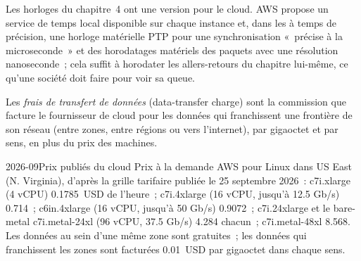Les horloges du chapitre~4 ont une version pour le cloud. AWS propose un service de temps local disponible sur chaque instance et, dans les  à temps de précision,
une horloge matérielle PTP pour une synchronisation «~précise à la microseconde~» et des horodatages matériels des paquets avec une résolution nanoseconde~; cela suffit à
horodater les allers-retours du chapitre lui-même, ce qu'une société doit faire pour voir sa queue.

\begin{definition}\label{def:nw:trading-in-a-public-cloud:dtc}
Les \emph{frais de transfert de données} (data-transfer charge) sont la commission que facture le fournisseur de cloud pour les données qui franchissent une frontière de son réseau (entre zones,
entre régions ou vers l'internet), par gigaoctet et par sens, en plus du prix des machines.
\end{definition}

\begin{dated}{2026-09}{Prix publiés du cloud}\label{dat:nw:trading-in-a-public-cloud:prices}
Prix à la demande AWS pour Linux dans US East (N. Virginia), d'après la grille tarifaire publiée le 25 septembre 2026~: c7i.xlarge (4 vCPU) 0.1785~USD de l'heure~;
c7i.4xlarge (16 vCPU, jusqu'à 12.5 Gb/s) 0.714~; c6in.4xlarge (16 vCPU, jusqu'à 50 Gb/s) 0.9072~; c7i.24xlarge et le bare-metal c7i.metal-24xl (96
vCPU, 37.5 Gb/s) 4.284 chacun~; c7i.metal-48xl 8.568. Les données au sein d'une même zone sont gratuites~; les données qui franchissent les zones sont facturées 0.01~USD par gigaoctet dans chaque
sens.
\end{dated}

